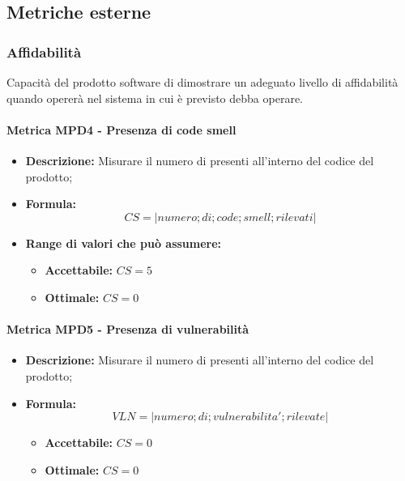        
\subsection{Metriche esterne}

\subsubsection{Affidabilità}
Capacità del prodotto software di dimostrare un adeguato livello di affidabilità quando opererà nel sistema in cui è previsto debba operare.

\paragraph{Metrica MPD4 - Presenza di code smell} %
\begin{itemize}
	\item \textbf{Descrizione:} Misurare il numero di  presenti all'interno del codice del prodotto;
	\item \textbf{Formula:} $$CS = {|numero ; di ; code ; smell ; rilevati|}$$
		\item \textbf{Range di valori che può assumere:}
	\begin{itemize}
		\item \textbf{Accettabile:} $CS = 5 $
		\item \textbf{Ottimale:} $CS = 0 $
	\end{itemize}
\end{itemize}

\paragraph{Metrica MPD5 - Presenza di vulnerabilità} %
\begin{itemize}
	\item \textbf{Descrizione:} Misurare il numero di  presenti all'interno del codice del prodotto;
	\item \textbf{Formula:} $$VLN = {|numero ; di ; vulnerabilita' ; rilevate|}$$
		\begin{itemize}
		\item \textbf{Accettabile:} $CS = 0 $
		\item \textbf{Ottimale:} $CS = 0 $
	\end{itemize}
\end{itemize}

